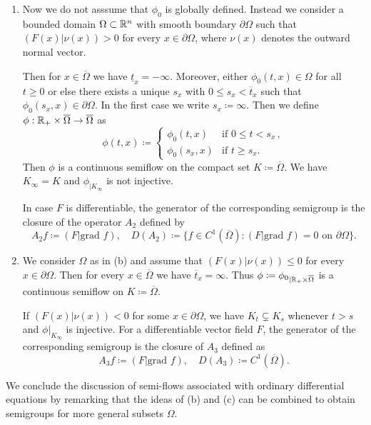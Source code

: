\begin{example}
\begin{enumerate}[\upshape (a), wide, labelindent=.5em]
	\item 
	Now we do not asssume that  $\phi_0$ is globally defined.
	Instead we consider a bounded domain $\Omega \subset \mathbb{R}^n$ with smooth boundary $\partial\Omega$ such that $(F(x)|\nu(x)) > 0$ for every $x \in \partial\Omega$, where $\nu(x)$ denotes the outward normal vector.
	
	Then for $x \in \overline{\Omega}$ we have $\underline{t}_{x} = -\infty$.
	Moreover, either $\phi_{0}(t,x) \in \Omega$ for all $t \geq 0$ or else there exists a unique $s_{x}$ with $0 \leq s_{x} < \overline{t}_{x}$ such that $\phi_{0}(s_{x},x) \in \partial\Omega$.
	In the first case we write $s_{x} \coloneq \infty$.
	Then we define $\phi: \mathbb{R}_{+} \times \overline{\Omega} \to \overline{\Omega}$ as 
	\[\phi(t,x) \coloneq \begin{cases}
		\phi_{0}(t,x) & \text{if } 0 \leq t < s_{x} \,, \\
		\phi_{0}(s_{x},x) & \text{if } t \geq s_{x} .
	\end{cases}\]
	Then $\phi$ is a continuous semiflow on the compact set $K \coloneq \overline{\Omega}$.
	We have $K_{\infty} = K$ and $\phi_{|K_{\infty}}$ is not injective.
	
	In case $F$ is differentiable, the generator of the corresponding semigroup is the closure of the operator $A_{2}$ defined by
	\[
	A_{2}f \coloneq (F|\text{grad }f), \quad D(A_{2}) \coloneq \{f \in C^1(\overline{\Omega}) \colon (F|\text{grad }f) = 0 \text{ on } \partial\Omega\}.	
	\]
	
	\item 
	We consider $\Omega$ as in (b) and assume that $(F(x)|\nu(x)) \leq 0$ for every $x \in \partial\Omega$.
	Then for every $x \in \overline{\Omega}$ we have $\overline{t}_{x} = \infty$.
	Thus $\phi \coloneq {\phi_{0}}_{|\mathbb{R}_{+}\times\overline{\Omega}}$ is a continuous semiflow on $K \coloneq \overline{\Omega}$.
	
	If $(F(x)|\nu(x)) < 0$ for some $x \in \partial\Omega$, we have $K_{t} \subsetneq K_{s}$ whenever $t > s$ and $\phi|_{K_{\infty}}$ is injective.
	For a differentiable vector field $F$, the generator of the corresponding semigroup is the closure of $A_{3}$ defined as
	\[
	A_{3}f \coloneq (F|\text{grad }f), \quad D(A_{3}) \coloneq C^1(\overline{\Omega}).
	\]
\end{enumerate}
\end{example}

We conclude the discussion of semi-flows associated with ordinary differential equations by remarking that the ideas of (b) and (c) can be combined to obtain semigroups for more general subsets $\Omega$.

